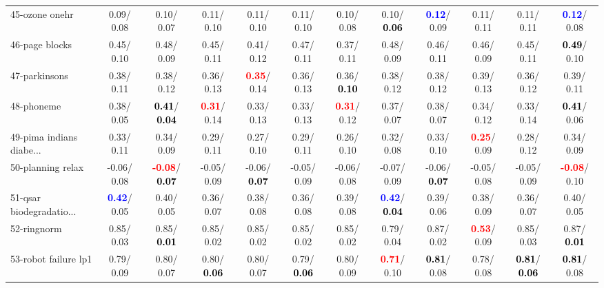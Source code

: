 \begin{table}[h]
\begin{center}
{\begin{tabular}{lc|c|c|c|c|c|c|c|c|c|c}
45-ozone onehr &   0.09/  0.08 &   0.10/  0.07 &   0.11/  0.10 &   0.11/  0.10 &   0.11/  0.10 &   0.10/  0.08 &   0.10/\textcolor{black}{\textbf{  0.06}} & \textcolor{blue}{\textbf{  0.12}}/  0.09 &   0.11/  0.11 &   0.11/  0.11 & \textcolor{blue}{\textbf{  0.12}}/  0.08 \\
46-page blocks &   0.45/  0.10 &   0.48/  0.09 &   0.45/  0.11 &   0.41/  0.12 &   0.47/  0.11 &   0.37/  0.11 &   0.48/  0.09 &   0.46/  0.11 &   0.46/  0.09 &   0.45/  0.11 & \textcolor{black}{\textbf{  0.49}}/  0.10 \\ \hline
47-parkinsons &   0.38/  0.11 &   0.38/  0.12 &   0.36/  0.13 & \textcolor{red}{\textbf{  0.35}}/  0.14 &   0.36/  0.13 &   0.36/\textcolor{black}{\textbf{  0.10}} &   0.38/  0.12 &   0.38/  0.12 &   0.39/  0.13 &   0.36/  0.12 &   0.39/  0.11 \\
48-phoneme &   0.38/  0.05 & \textcolor{black}{\textbf{  0.41}}/\textcolor{black}{\textbf{  0.04}} & \textcolor{red}{\textbf{  0.31}}/  0.14 &   0.33/  0.13 &   0.33/  0.13 & \textcolor{red}{\textbf{  0.31}}/  0.12 &   0.37/  0.07 &   0.38/  0.07 &   0.34/  0.12 &   0.33/  0.14 & \textcolor{black}{\textbf{  0.41}}/  0.06 \\
49-pima indians diabe... &   0.33/  0.11 &   0.34/  0.09 &   0.29/  0.11 &   0.27/  0.10 &   0.29/  0.11 &   0.26/  0.10 &   0.32/  0.08 &   0.33/  0.10 & \textcolor{red}{\textbf{  0.25}}/  0.09 &   0.28/  0.12 &   0.34/  0.09 \\
50-planning relax &  -0.06/  0.08 & \textcolor{red}{\textbf{ -0.08}}/\textcolor{black}{\textbf{  0.07}} &  -0.05/  0.09 &  -0.06/\textcolor{black}{\textbf{  0.07}} &  -0.05/  0.09 &  -0.06/  0.08 &  -0.07/  0.09 &  -0.06/\textcolor{black}{\textbf{  0.07}} &  -0.05/  0.08 &  -0.05/  0.09 & \textcolor{red}{\textbf{ -0.08}}/  0.10 \\
51-qsar biodegradatio... & \textcolor{blue}{\textbf{  0.42}}/  0.05 &   0.40/  0.05 &   0.36/  0.07 &   0.38/  0.08 &   0.36/  0.08 &   0.39/  0.08 & \textcolor{blue}{\textbf{  0.42}}/\textcolor{black}{\textbf{  0.04}} &   0.39/  0.06 &   0.38/  0.09 &   0.36/  0.07 &   0.40/  0.05 \\
52-ringnorm &   0.85/  0.03 &   0.85/\textcolor{black}{\textbf{  0.01}} &   0.85/  0.02 &   0.85/  0.02 &   0.85/  0.02 &   0.85/  0.02 &   0.79/  0.04 &   0.87/  0.02 & \textcolor{red}{\textbf{  0.53}}/  0.09 &   0.85/  0.03 &   0.87/\textcolor{black}{\textbf{  0.01}} \\
53-robot failure lp1 &   0.79/  0.09 &   0.80/  0.07 &   0.80/\textcolor{black}{\textbf{  0.06}} &   0.80/  0.07 &   0.79/\textcolor{black}{\textbf{  0.06}} &   0.80/  0.09 & \textcolor{red}{\textbf{  0.71}}/  0.10 & \textcolor{black}{\textbf{  0.81}}/  0.08 &   0.78/  0.08 & \textcolor{black}{\textbf{  0.81}}/\textcolor{black}{\textbf{  0.06}} & \textcolor{black}{\textbf{  0.81}}/  0.08 \\ \hline

\end{tabular}}
\end{center}
\end{table}
